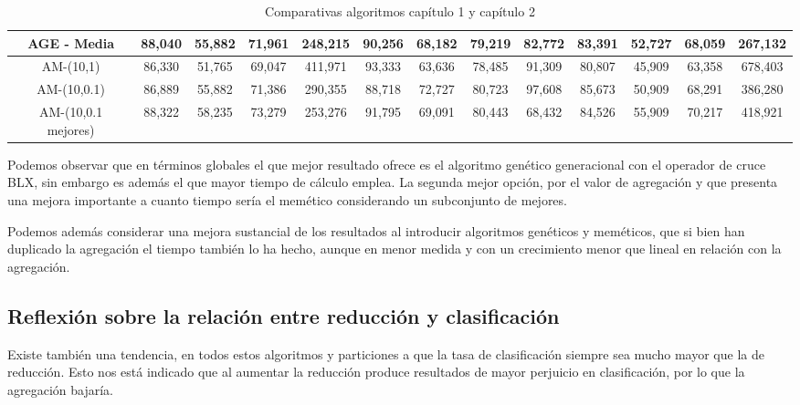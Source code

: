 \begin{table}[H]
{\begin{tabular}{|c|c|c|c|c|c|c|c|c|c|c|c|c| }
    AGE - Media 
    & 88,040 & 55,882 & 71,961 & 248,215  %
    & 90,256 & 68,182 & 79,219 & 82,772  %
    & 83,391 & 52,727 & 68,059 & 267,132  %
    \\ \hline
    AM-(10,1)
    & 86,330 & 51,765 & 69,047 & 411,971 %
    & 93,333 & 63,636 & 78,485 & 91,309 %
    & 80,807 & 45,909 & 63,358 & 678,403  %
    \\ \hline

    AM-(10,0.1)
    & 86,889 & 55,882 & 71,386 & 290,355 %
    & 88,718 & 72,727 & 80,723 & 97,608 %
    & 85,673 & 50,909 & 68,291 & 386,280   %
    \\ \hline

    AM-(10,0.1 mejores)
    & 88,322 & 58,235 & 73,279 & 253,276 %
    & 91,795 & 69,091 & 80,443 & 68,432  %
    & 84,526 & 55,909 & 70,217 & 418,921  %
    \\ \hline


    \end{tabular}
    }
    \caption{Comparativas algoritmos capítulo 1 y capítulo 2}
    \label{Tabla:comparativas-algoritmos-P2}
\end{table}

Podemos observar que en términos globales el que mejor resultado ofrece es 
el algoritmo genético generacional con el operador de cruce BLX, sin embargo es además el que mayor tiempo de cálculo emplea. 
La segunda mejor opción, por el valor de agregación y que presenta una mejora importante a cuanto tiempo sería el memético considerando un subconjunto de mejores.   

Podemos además considerar una mejora sustancial de los resultados al introducir algoritmos genéticos y meméticos, que si bien han duplicado la agregación el tiempo también lo ha hecho, aunque en menor medida y con un crecimiento menor que lineal en relación con la agregación. 
\subsection{Reflexión sobre la relación entre reducción y clasificación}
Existe también una tendencia, en todos estos algoritmos  y particiones a que la tasa de clasificación siempre sea mucho mayor que la de reducción. Esto nos está indicado que al aumentar la reducción produce resultados de mayor perjuicio en clasificación, por lo que la agregación bajaría. 
